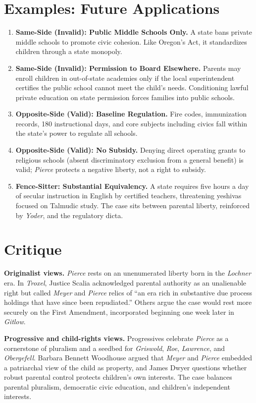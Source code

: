 \documentclass[12pt]{article}
\begin{document}
\section{Examples: Future Applications}

\begin{enumerate}
\item \textbf{Same-Side (Invalid): Public Middle Schools Only.} A state bans private middle schools to promote civic cohesion. Like Oregon's Act, it standardizes children through a state monopoly.
\item \textbf{Same-Side (Invalid): Permission to Board Elsewhere.} Parents may enroll children in out-of-state academies only if the local superintendent certifies the public school cannot meet the child's needs. Conditioning lawful private education on state permission forces families into public schools.
\item \textbf{Opposite-Side (Valid): Baseline Regulation.} Fire codes, immunization records, 180 instructional days, and core subjects including civics fall within the state's power to regulate all schools.
\item \textbf{Opposite-Side (Valid): No Subsidy.} Denying direct operating grants to religious schools (absent discriminatory exclusion from a general benefit) is valid; \textit{Pierce} protects a negative liberty, not a right to subsidy.
\item \textbf{Fence-Sitter: Substantial Equivalency.} A state requires five hours a day of secular instruction in English by certified teachers, threatening yeshivas focused on Talmudic study. The case sits between parental liberty, reinforced by \textit{Yoder}, and the regulatory dicta.
\end{enumerate}

\section{Critique}

\textbf{Originalist views.} \textit{Pierce} rests on an unenumerated liberty born in the \textit{Lochner} era. In \textit{Troxel}, Justice Scalia acknowledged parental authority as an unalienable right but called \textit{Meyer} and \textit{Pierce} relics of ``an era rich in substantive due process holdings that have since been repudiated.'' Others argue the case would rest more securely on the First Amendment, incorporated beginning one week later in \textit{Gitlow}.

\textbf{Progressive and child-rights views.} Progressives celebrate \textit{Pierce} as a cornerstone of pluralism and a seedbed for \textit{Griswold}, \textit{Roe}, \textit{Lawrence}, and \textit{Obergefell}. Barbara Bennett Woodhouse argued that \textit{Meyer} and \textit{Pierce} embedded a patriarchal view of the child as property, and James Dwyer questions whether robust parental control protects children's own interests. The case balances parental pluralism, democratic civic education, and children's independent interests.
\end{document}
